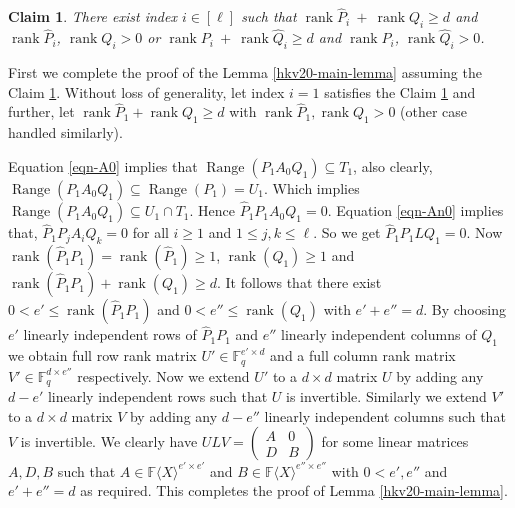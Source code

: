 \documentclass[10pt,a4paper]{article}
\DeclareMathOperator{\range}{Range}
\newtheorem{claim}[theorem]{Claim}
\newcommand{\op}[1]{\ensuremath{\operatorname{#1}}}
\newcommand{\F}{\mathbb{F}}
\renewcommand{\angle}[1]{\langle #1 \rangle}
\newcommand{\FX}{\F\angle{X}}
\newcommand{\rank}{\op{rank}}
\newcommand{\fR}{\FX}
\begin{document}
\begin{claim} \label{php-simplify}
There exist index $i \in[\ell]$ such that $\rank \hat{P}_i ~+~ \rank Q_i \geq d$ and $\rank \hat{P}_i$, $\rank Q_i>0$ or $\rank {P}_i ~+~ \rank \hat{Q}_i \geq d$ and $\rank {P}_i$, $\rank \hat{Q}_i>0$. 
\end{claim}
First we complete the proof of the Lemma \ref{hkv20-main-lemma} assuming the Claim \ref{php-simplify}.
Without loss of generality, let index $i=1$ satisfies the Claim \ref{php-simplify} and further, let $\rank
\hat{P}_1 + \rank Q_1 \geq d$ with $\rank \hat{P}_1, \rank Q_1 >0$
(other case handled similarly).

Equation \ref{eqn-A0} implies that $\range(P_1 A_0 Q_1) \subseteq
T_1$, also clearly, $\range(P_1 A_0 Q_1) \subseteq \range(P_1)=
U_1$. Which implies $\range(P_1 A_0 Q_1)\subseteq U_1 \cap T_1$. Hence
$\hat{P}_1 P_1 A_0 Q_1 =0$. Equation \ref{eqn-An0} implies that,
$\hat{P}_1 P_j A_i Q_k= 0$ for all $i \geq 1$ and $1\leq j, k \leq
\ell$. So we get $\hat{P}_1 P_1 L Q_1 = 0$. Now $\rank(\hat{P}_1P_1) =
\rank(\hat{P}_1)\geq 1$, $\rank(Q_1) \geq 1$ and $\rank(\hat{P}_1
P_1)+\rank(Q_1) \geq d$. It follows that there exist $0 < e' \leq
\rank(\hat{P}_1 P_1)$ and $0 < e'' \leq \rank(Q_1)$ with $e'+e'' =
d$. By choosing $e'$ linearly independent rows of $\hat{P}_1P_1$ and
$e''$ linearly independent columns of $Q_1$ we obtain full row rank
matrix $U' \in \mathbb{F}_q^{e' \times d}$ and a full column rank
matrix $V' \in \mathbb{F}_q^{d \times e''}$ respectively.  Now we
extend $U'$ to a $d \times d$ matrix $U$ by adding any $d-e'$ linearly
independent rows such that $U$ is invertible. Similarly we extend $V'$
to a $d \times d$ matrix $V$ by adding any $d-e''$ linearly
independent columns such that $V$ is invertible. We clearly have $ULV
=\left(
\begin{array}{c|c}
A & 0 \\
\hline
D & B
\end{array}
\right)$ for some linear matrices $A, D, B$ such that $A \in \fR^{e' \times e'}$ and $B \in \fR^{e'' \times e''}$ with $0< e', e''$ and $e' + e'' =d$ as required. This completes the proof of Lemma \ref{hkv20-main-lemma}.
\\
\end{document}
